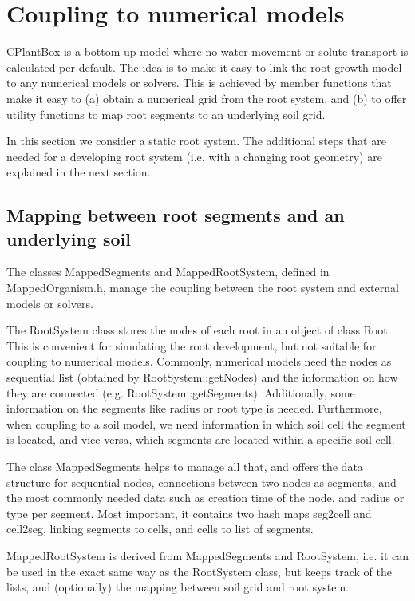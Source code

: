 \newpage
\section{Coupling to numerical models} \label{s:coupling}

CPlantBox is a bottom up model where no water movement or solute transport is calculated per default. The idea is to make it easy to link the root growth model to any numerical models or solvers. This is achieved by member functions that make it easy to (a) obtain a numerical grid from the root system, and (b) to offer utility functions to map root segments to an underlying soil grid. 

In this section we consider a static root system. The additional steps that are needed for a developing root system (i.e. with a changing root geometry) are explained in the next section. 

\subsection{Mapping between root segments and an underlying soil} \label{ss:mapping}

The classes MappedSegments and MappedRootSystem, defined in MappedOrganism.h, manage the coupling between the root system and external models or solvers. 

The RootSystem class stores the nodes of each root in an object of class Root. This is convenient for simulating the root development, but not suitable for coupling to numerical models. Commonly, numerical models need the nodes as sequential list (obtained by RootSystem::getNodes) and the information on how they are connected (e.g. RootSystem::getSegments). Additionally, some information on the segments like radius or root type is needed. Furthermore, when coupling to a soil model, we need information in which soil cell the segment is located, and vice versa, which segments are located within a specific soil cell. 

The class MappedSegments helps to manage all that, and offers the data structure for sequential nodes, connections between two nodes as segments, and the most commonly needed data such as creation time of the node, and radius or type per segment. Most important, it contains two hash maps seg2cell and cell2seg, linking segments to cells, and cells to list of segments.

MappedRootSystem is derived from MappedSegments and RootSystem, i.e. it can be used in the exact same way as the RootSystem class, but keeps track of the lists, and (optionally) the mapping between soil grid and root system.

